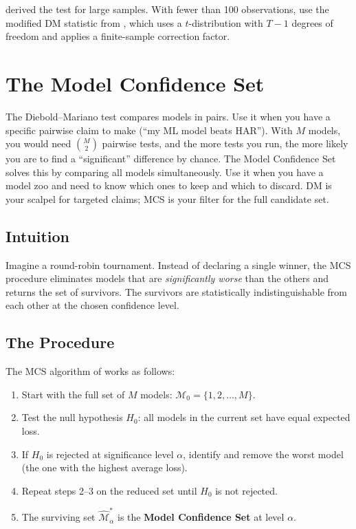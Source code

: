 \begin{warning}
\citet{DieboldMariano1995} derived the test for large samples.
With fewer than 100 observations, use the modified DM statistic from \citet{HarveyLeybourneNewbold1997}, which uses a $t$-distribution with $T-1$ degrees of freedom and applies a finite-sample correction factor.
\end{warning}


\section{The Model Confidence Set}
\label{sec:eval-mcs}

The Diebold--Mariano test compares models in pairs.
Use it when you have a specific pairwise claim to make (``my ML model beats HAR'').
With $M$ models, you would need $\binom{M}{2}$ pairwise tests, and the more tests you run, the more likely you are to find a ``significant'' difference by chance.
The Model Confidence Set solves this by comparing all models simultaneously.
Use it when you have a model zoo and need to know which ones to keep and which to discard.
DM is your scalpel for targeted claims; MCS is your filter for the full candidate set.

\subsection{Intuition}

\begin{intuition}
Imagine a round-robin tournament.
Instead of declaring a single winner, the MCS procedure eliminates models that are \emph{significantly worse} than the others and returns the set of survivors.
The survivors are statistically indistinguishable from each other at the chosen confidence level.
\end{intuition}

\subsection{The Procedure}

The MCS algorithm of \citet{HansenLundeNason2011} works as follows:

\begin{enumerate}[nosep]
  \item Start with the full set of $M$ models: $\mathcal{M}_0 = \{1, 2, \ldots, M\}$.
  \item Test the null hypothesis $H_0$: all models in the current set have equal expected loss.
  \item If $H_0$ is rejected at significance level $\alpha$, identify and remove the worst model (the one with the highest average loss).
  \item Repeat steps 2--3 on the reduced set until $H_0$ is not rejected.
  \item The surviving set $\widehat{\mathcal{M}}^*_\alpha$ is the \textbf{Model Confidence Set} at level $\alpha$.
\end{enumerate}

